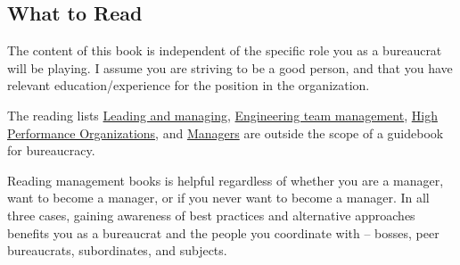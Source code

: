 \subsection{What to Read\label{sec:to_read}}

The content of this book is independent of the specific role you as a bureaucrat will be playing. I assume you are striving to be a good person, and that you have relevant education/experience for the position in the organization.

The reading lists 
\href{https://github.com/LappleApple/awesome-leading-and-managing}{Leading and managing}, 
\href{https://github.com/kdeldycke/awesome-engineering-team-management}{Engineering team management}, 
\href{https://github.com/pdfernhout/High-Performance-Organizations-Reading-List}{High Performance Organizations}, and 
\href{https://github.com/ankitjaininfo/awesome-managers}{Managers}
are outside the scope of a guidebook for bureaucracy. 


Reading management books is helpful regardless of whether you are a manager, want to become a manager, or if you never want to become a manager. In all three cases, gaining awareness of best practices and alternative approaches benefits you as a bureaucrat and the people you coordinate with -- bosses, peer bureaucrats, subordinates, and subjects.

